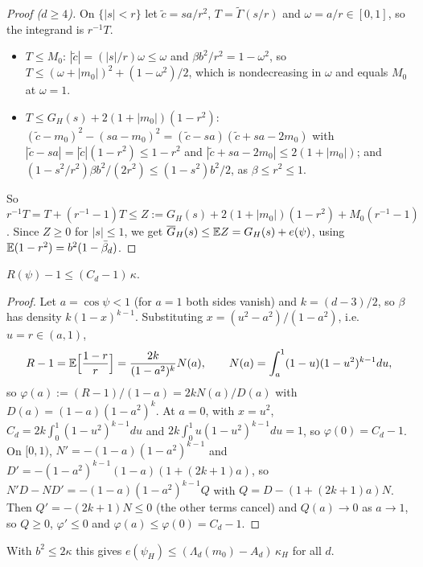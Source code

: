 \documentclass[11pt]{article}
\newcommand{\Abb}{\bar\beta}
\begin{document}
\begin{proof}[Proof ($d \ge 4$)]
On $\{|s| < r\}$ let $\tilde c = sa/r^2$, $T = \tilde\Gamma(s/r)$ and $\omega = a/r \in [0, 1]$, so the integrand
is $r^{-1}T$.
\begin{itemize}
  \item $T \le M_0$: $|\tilde c| = (|s|/r)\omega \le \omega$ and $\beta b^2/r^2 = 1 - \omega^2$, so
    $T \le (\omega + |m_0|)^2 + (1 - \omega^2)/2$, which is nondecreasing in $\omega$ and equals $M_0$ at $\omega = 1$.
  \item $T \le G_H(s) + 2(1 + |m_0|)(1 - r^2)$: $(\tilde c - m_0)^2 - (sa - m_0)^2 = (\tilde c - sa)(\tilde c + sa - 2m_0)$
    with $|\tilde c - sa| = |\tilde c|(1 - r^2) \le 1 - r^2$ and $|\tilde c + sa - 2m_0| \le 2(1 + |m_0|)$; and
    $(1 - s^2/r^2)\beta b^2/(2r^2) \le (1 - s^2)b^2/2$, as $\beta \le r^2 \le 1$.
\end{itemize}
So $r^{-1}T = T + (r^{-1} - 1)T \le Z := G_H(s) + 2(1 + |m_0|)(1 - r^2) + M_0(r^{-1} - 1)$. Since $Z \ge 0$ for
$|s| \le 1$, we get $\overline G_H(s) \le \mathbb{E} Z = G_H(s) + e(\psi)$, using $\E(1 - r^2) = b^2(1 - \Abb_d)$.
\end{proof}

\begin{lemma}[$d \ge 4$]\label{lem:R}
$R(\psi) - 1 \le (C_d - 1)\, \kappa$.
\end{lemma}

\begin{proof}
Let $a = \cos\psi < 1$ (for $a = 1$ both sides vanish) and $k = (d-3)/2$, so $\beta$ has density $k(1-x)^{k-1}$.
Substituting $x = (u^2 - a^2)/(1 - a^2)$, i.e.\ $u = r \in (a, 1)$,
\[
  R - 1 = \mathbb{E}\Bigl[\frac{1 - r}{r}\Bigr] = \frac{2k}{(1 - a^2)^k}N(a), \qquad N(a) = \int_a^1(1 - u)(1 - u^2)^{k-1}du,
\]
so $\varphi(a) := (R - 1)/(1 - a) = 2kN(a)/D(a)$ with $D(a) = (1 - a)(1 - a^2)^k$. At $a = 0$, with $x = u^2$,
$C_d = 2k\int_0^1(1 - u^2)^{k-1}du$ and $2k\int_0^1u(1 - u^2)^{k-1}du = 1$, so $\varphi(0) = C_d - 1$. On $[0, 1)$,
$N' = -(1 - a)(1 - a^2)^{k-1}$ and $D' = -(1 - a^2)^{k-1}(1 - a)(1 + (2k + 1)a)$, so
$N'D - ND' = -(1 - a)(1 - a^2)^{k-1}Q$ with $Q = D - (1 + (2k+1)a)N$. Then $Q' = -(2k + 1)N \le 0$ (the other terms
cancel) and $Q(a) \to 0$ as $a \to 1$, so $Q \ge 0$, $\varphi' \le 0$ and $\varphi(a) \le \varphi(0) = C_d - 1$.
\end{proof}

With $b^2 \le 2\kappa$ this gives $e(\psi_H) \le (\Lambda_d(m_0) - A_d)\, \kappa_H$ for all $d$.
\end{document}
